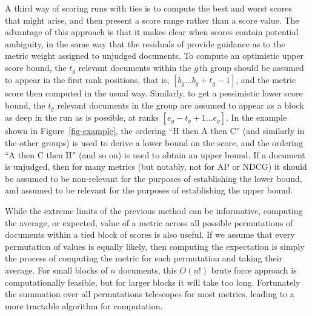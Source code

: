 A third way of scoring runs with ties is to compute the best and
worst scores that might arise, and then present a score range rather
than a score value.
The advantage of this approach is that it makes clear when scores
contain potential ambiguity, in the same way that the residuals of
{\citet{mz08acmtois}} provide guidance as to the metric weight
assigned to unjudged documents.
To compute an optimistic upper score bound, the $t_g$ relevant
documents within the $g$\,th group should be assumed to appear in the
first rank positions, that is, $[b_g\ldots b_g+t_g-1]$, and the
metric score then computed in the usual way.
Similarly, to get a pessimistic lower score bound, the $t_g$ relevant
documents in the group are assumed to appear as a block as deep in
the run as is possible, at ranks $[e_g-t_g+1\ldots e_g]$.
In the example shown in Figure~\ref{fig-example}, the ordering ``H
then A then C'' (and similarly in the other groups) is used to derive
a lower bound on the score, and the ordering ``A then C then H'' (and
so on) is used to obtain an upper bound.
If a document is unjudged, then for many metrics (but notably, not
for AP or NDCG) it should be assumed to be non-relevant for the
purposes of establishing the lower bound, and assumed to be relevant
for the purposes of establishing the upper bound.

While the extreme limits of the previous method can be informative, 
computing the average, or expected, value of a metric across all possible 
permutations of documents within a tied block of scores is also useful.
If we assume that every permutation of values is equally likely, 
then computing the expectation is simply the process of computing the 
metric for each permutation and taking their average.
For small blocks of $n$ documents, this $O(n!)$ brute force approach 
is computationally feasible, but 
for larger blocks it will take too long.
Fortunately the summation over all permutations telescopes for most metrics, 
leading to a more tractable algorithm for computation.

